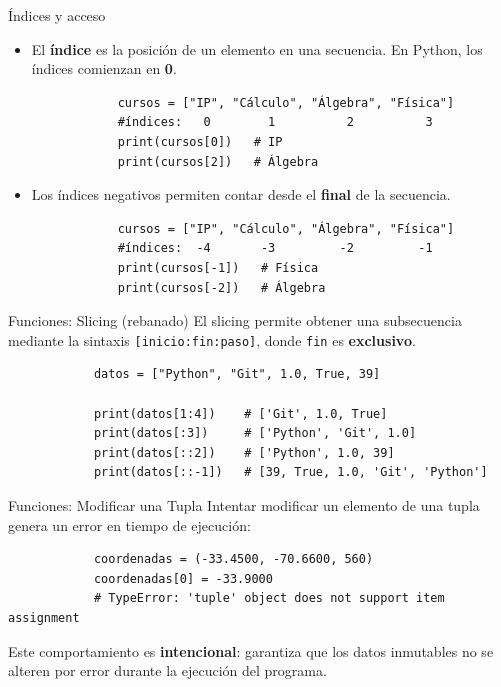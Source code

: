 \documentclass{beamer}
\begin{document}
    \begin{frame}[fragile, t]{Índices y acceso}
        \begin{itemize}
            \item El \textbf{índice} es la posición de un elemento en una secuencia. En Python, los índices comienzan en \textbf{0}.
            \begin{verbatim} 
            cursos = ["IP", "Cálculo", "Álgebra", "Física"]
            #índices:   0        1          2          3
            print(cursos[0])   # IP
            print(cursos[2])   # Álgebra
            \end{verbatim}
            \item Los índices negativos permiten contar desde el \textbf{final} de la secuencia.
            \begin{verbatim}
            cursos = ["IP", "Cálculo", "Álgebra", "Física"]
            #índices:  -4       -3         -2         -1
            print(cursos[-1])   # Física
            print(cursos[-2])   # Álgebra
            \end{verbatim}
        \end{itemize}
    \end{frame}

    \begin{frame}[fragile, t]{Funciones: Slicing (rebanado)}
        El slicing permite obtener una subsecuencia mediante la sintaxis \texttt{[inicio:fin:paso]}, donde \texttt{fin} es \textbf{exclusivo}.

        \begin{verbatim}
            datos = ["Python", "Git", 1.0, True, 39]
 
            print(datos[1:4])    # ['Git', 1.0, True]
            print(datos[:3])     # ['Python', 'Git', 1.0]
            print(datos[::2])    # ['Python', 1.0, 39]
            print(datos[::-1])   # [39, True, 1.0, 'Git', 'Python']
        \end{verbatim}
    \end{frame}

    \begin{frame}[fragile, t]{Funciones: Modificar una Tupla}
        Intentar modificar un elemento de una tupla genera un error en tiempo de ejecución:

        \begin{verbatim}
            coordenadas = (-33.4500, -70.6600, 560)
            coordenadas[0] = -33.9000   
            # TypeError: 'tuple' object does not support item assignment
        \end{verbatim}
        Este comportamiento es \textbf{intencional}: garantiza que los datos inmutables no se alteren por error durante la ejecución del programa.
    \end{frame}
\end{document}
